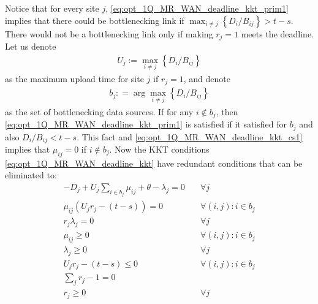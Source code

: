 Notice that for every site $j$, \eqref{eq:opt_1Q_MR_WAN_deadline_kkt_prim1} implies that there could be bottlenecking link if $\max_{i\neq j}\left\{D_i/B_{ij}\right\}>t-s$.
There would not be a bottlenecking link only if making $r_j=1$ meets the deadline.
Let us denote
\begin{align}
	U_j := \max_{i\neq j}\left\{D_i/B_{ij}\right\}
\end{align}
as the maximum upload time for site $j$ if $r_j=1$, and denote
\begin{align}
	b_j: = \arg\max_{i\neq j}\left\{D_i/B_{ij}\right\}
\end{align}
as the set of bottlenecking data sources.
If for any $i\notin b_j$, then \eqref{eq:opt_1Q_MR_WAN_deadline_kkt_prim1} is satisfied if it satisfied for $b_j$ and also $D_i/B_{ij}<t-s$.
This fact and \eqref{eq:opt_1Q_MR_WAN_deadline_kkt_cs1} implies that $\mu_{ij}=0$ if $i\notin b_j$.
Now the KKT conditions \eqref{eq:opt_1Q_MR_WAN_deadline_kkt} have redundant conditions that can be eliminated to:
\begin{subequations}\label{eq:opt_1Q_MR_WAN_deadline_kkt2}
	\begin{align}
		-D_j+U_j\sum_{i\in b_j}\mu_{ij} + \theta - \lambda_j = 0 & \quad \forall j \label{eq:opt_1Q_MR_WAN_deadline_kkt2_stat}\\
		\mu_{ij}\left(U_jr_{j} - (t - s)\right) = 0 & \quad \forall (i,j):i\in b_j \label{eq:opt_1Q_MR_WAN_deadline_kkt2_cs1}\\
		r_j\lambda_j = 0 & \quad \forall j \label{eq:opt_1Q_MR_WAN_deadline_kkt2_cs2}\\
		\mu_{ij} \geq 0 & \quad \forall (i,j):i\in b_j \label{eq:opt_1Q_MR_WAN_deadline_kkt2_dual1}\\
		\lambda_j \geq 0  & \quad \forall j \label{eq:opt_1Q_MR_WAN_deadline_kkt2_dual2}\\
		U_jr_{j} - (t - s) \leq 0  & \quad \forall (i,j):i\in b_j \label{eq:opt_1Q_MR_WAN_deadline_kkt2_prim1}\\
		\sum_{j}r_{j} - 1 = 0 & \label{eq:opt_1Q_MR_WAN_deadline_kkt2_prim2}\\
		r_{j} \geq 0 & \quad \forall j \label{eq:opt_1Q_MR_WAN_deadline_kkt2_prim3}
	\end{align}
\end{subequations}

